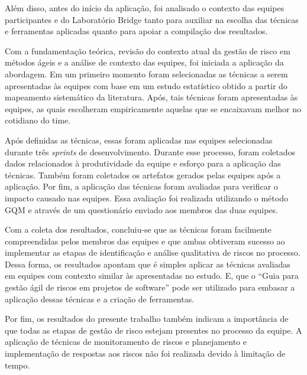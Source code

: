 \documentclass[
    12pt,       %
    openright,      %
    twoside,      %
    a4paper,      %
    english,      %
    french,       %
    spanish,      %
    brazil,       %
    ]{abntex2}
\begin{document}
Além disso, antes do início da aplicação, foi analisado o contexto das equipes participantes e do Laboratório Bridge tanto para auxiliar na escolha das técnicas e ferramentas aplicadas quanto para apoiar a compilação dos resultados.

Com a fundamentação teórica, revisão do contexto atual da gestão de risco em métodos ágeis e a análise de contexto das equipes, foi iniciada a aplicação da abordagem. Em um primeiro momento foram selecionadas as técnicas a serem apresentadas às equipes com base em um estudo estatístico obtido a partir do mapeamento sistemático da literatura. Após, tais técnicas foram apresentadas às equipes, as quais escolheram empiricamente aquelas que se encaixavam melhor no cotidiano do time. 

Após definidas as técnicas, essas foram aplicadas nas equipes selecionadas durante três \textit{sprints} de desenvolvimento. Durante esse processo, foram coletados dados relacionados à produtividade da equipe e esforço para a aplicação das técnicas. Também foram coletados os artefatos gerados pelas equipes após a aplicação. Por fim, a aplicação das técnicas foram avaliadas para verificar o impacto causado nas equipes. Essa avaliação foi realizada utilizando o método GQM e através de um questionário enviado aos membros das duas equipes. 

Com a coleta dos resultados, concluiu-se que as técnicas foram facilmente compreendidas pelos membros das equipes e que ambas obtiveram sucesso ao implementar as etapas de identificação e análise qualitativa de riscos no processo. Dessa forma, os resultados apontam que é simples aplicar as técnicas avaliadas em equipes com contexto similar às apresentadas no estudo. E, que o “Guia para gestão ágil de riscos em projetos de software” pode ser utilizado para embasar a aplicação dessas técnicas e a criação de ferramentas. 

Por fim, os resultados do presente trabalho também indicam a importância de que todas as etapas de gestão de risco estejam presentes no processo da equipe. A aplicação de técnicas de monitoramento de riscos e planejamento e implementação de respostas aos riscos não foi realizada devido à limitação de tempo.

  \postextual


  
  
  
\end{document}

